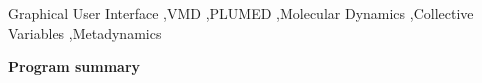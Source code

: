 \documentclass[preprint,12pt]{elsarticle}
\newcommand{\mykeywords}{Graphical User Interface \sep VMD \sep PLUMED \sep Molecular Dynamics \sep Collective Variables \sep Metadynamics}
\begin{document}
\begin{frontmatter}



\begin{keyword}
\mykeywords
\end{keyword}

\end{frontmatter}



{\bf Program summary}
\end{document}
